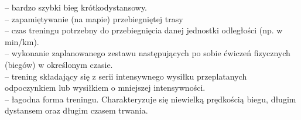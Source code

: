 	-- bardzo szybki bieg krótkodystansowy.\\
	-- zapamiętywanie (na mapie) przebiegniętej trasy\\
	-- czas treningu potrzebny do przebiegnięcia danej jednostki odległości (np. w min/km).\\
	-- wykonanie zaplanowanego zestawu następujących po sobie ćwiczeń fizycznych (biegów) w określonym czasie. \\
	-- trening składający się z serii intensywnego wysiłku przeplatanych odpoczynkiem lub wysiłkiem o mniejszej intensywności.\\
	-- łagodna forma treningu. Charakteryzuje się niewielką prędkością biegu, długim dystansem oraz długim czasem trwania.\\
